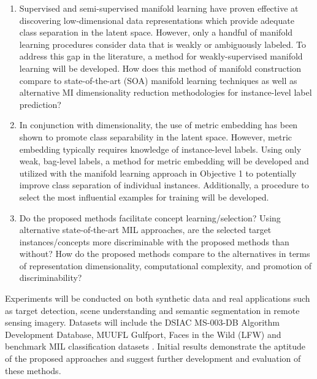 \begin{enumerate}
	\item Supervised and semi-supervised manifold learning have proven effective at discovering low-dimensional data representations which provide adequate class separation in the latent space.  However, only a handful of manifold learning procedures consider data that is weakly or ambiguously labeled.  To address this gap in the literature, a method for weakly-supervised manifold learning will be developed. How does this method of manifold construction compare to state-of-the-art (SOA) manifold learning techniques as well as alternative MI dimensionality reduction methodologies for instance-level label prediction?
	\item In conjunction with dimensionality, the use of metric embedding has been shown to promote class separability in the latent space. However, metric embedding typically requires knowledge of instance-level labels.  Using only weak, bag-level labels, a method for metric embedding will be developed and utilized with the manifold learning approach in Objective 1 to potentially improve class separation of individual instances.  Additionally, a procedure to select the most influential examples for training will be developed.
	\item Do the proposed methods facilitate concept learning/selection?  Using alternative state-of-the-art MIL approaches, are the selected target instances/concepts more discriminable with the proposed methods than without?  How do the proposed methods compare to the alternatives in terms of representation dimensionality, computational complexity, and promotion of discriminability?
\end{enumerate} 

Experiments will be conducted on both synthetic data and real applications such as target detection, scene understanding and semantic segmentation in remote sensing imagery.  Datasets will include the DSIAC MS-003-DB Algorithm Development Database, MUUFL Gulfport, Faces in the Wild (LFW) and benchmark MIL classification datasets \citep{DSIACATR,MUUFL,MUUFLSceneLabels,MUUFLScoringCode,LFW}.  Initial results demonstrate the aptitude of the proposed approaches and suggest further development and evaluation of these methods.




